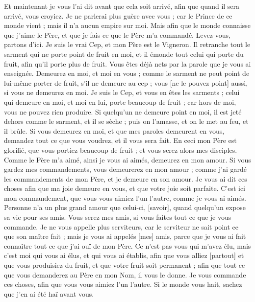 \begin{multicols}{2}
Et maintenant je vous l'ai dit avant que cela soit arrivé, afin que quand il sera arrivé, vous croyiez.
Je ne parlerai plus guère avec vous ; car le Prince de ce monde vient ; mais il n'a aucun empire sur moi.
Mais afin que le monde connaisse que j'aime le Père, et que je fais ce que le Père m'a commandé. Levez-vous, partons d'ici.
\VerseOne{}Je suis le vrai Cep, et mon Père est le Vigneron.
Il retranche tout le sarment qui ne porte point de fruit en moi, et il émonde tout celui qui porte du fruit, afin qu'il porte plus de fruit.
Vous êtes déjà nets par la parole que je vous ai enseignée.
Demeurez en moi, et moi en vous ; comme le sarment ne peut point de lui-même porter de fruit, s'il ne demeure au cep ; vous [ne le pouvez point] aussi, si vous ne demeurez en moi.
Je suis le Cep, et vous en êtes les sarments ; celui qui demeure en moi, et moi en lui, porte beaucoup de fruit ; car hors de moi, vous ne pouvez rien produire.
Si quelqu'un ne demeure point en moi, il est jeté dehors comme le sarment, et il se sèche ; puis on l'amasse, et on le met au feu, et il brûle.
Si vous demeurez en moi, et que mes paroles demeurent en vous, demandez tout ce que vous voudrez, et il vous sera fait.
En ceci mon Père est glorifié, que vous portiez beaucoup de fruit ; et vous serez alors mes disciples.
Comme le Père m'a aimé, ainsi je vous ai aimés, demeurez en mon amour.
Si vous gardez mes commandements, vous demeurerez en mon amour ; comme j'ai gardé les commandements de mon Père, et je demeure en son amour.
Je vous ai dit ces choses afin que ma joie demeure en vous, et que votre joie soit parfaite.
C'est ici mon commandement, que vous vous aimiez l'un l'autre, comme je vous ai aimés.
Personne n'a un plus grand amour que celui-ci, [savoir], quand quelqu'un expose sa vie pour ses amis.
Vous serez mes amis, si vous faites tout ce que je vous commande.
Je ne vous appelle plus serviteurs, car le serviteur ne sait point ce que son maître fait ; mais je vous ai appelés [mes] amis, parce que je vous ai fait connaître tout ce que j'ai ouï de mon Père.
Ce n'est pas vous qui m'avez élu, mais c'est moi qui vous ai élus, et qui vous ai établis, afin que vous alliez [partout] et que vous produisiez du fruit, et que votre fruit soit permanent ; afin que tout ce que vous demanderez au Père en mon Nom, il vous le donne.
Je vous commande ces choses, afin que vous vous aimiez l'un l'autre.
Si le monde vous hait, sachez que j'en ai été haï avant vous.

\end{multicols}
